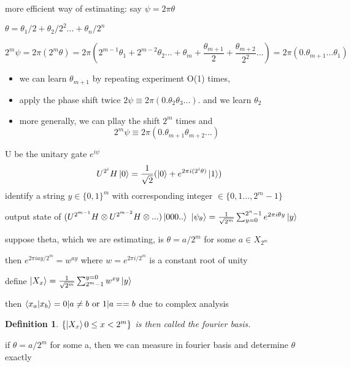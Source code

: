 \documentclass[10pt]{article}
\newcommand{\su}[2]{\sum_{#1}^{#2}}
\theoremstyle{break}
\newtheorem{defn}{Definition}[subsection]
\begin{document}
        \subsection{}
        more efficient way of estimating: say $\psi = 2\pi\theta$

        $\theta = \theta_1/2+\theta_2/2^2...+\theta_n/2^n$

        $$2^m\psi = 2\pi (2^m\theta) = 2\pi(2^{m-1}\theta_1+2^{m-2}\theta_2...+\theta_m+\frac{\theta_{m+1}}{2}+\frac{\theta_{m+2}}{2^2}...)
        =
        2\pi(0.\theta_{m+1}...\theta_1)$$
        
        \begin{itemize}
            \item we can learn $\theta_{m+1}$ by repeating experiment O(1) times, 
            \item apply the phase shift twice $2\psi \equiv 2\pi(0.\theta_2\theta_3...)$. and we learn $\theta_2$
            \item more generally, we can pllay the shift $2^m$ times and 
            $$2^m\psi\equiv 2\pi(0.\theta_{m+1}\theta_{m+2}...)$$
        \end{itemize}
        U be the unitary gate $e^{i\psi}$
        $$U^{2^i} H \ket{0} = \frac{1}{\sqrt{2}}(\ket{0}+e^{2\pi i(2^i\theta)}\ket{1})$$
        identify a string $y\in\{0,1\}^m$ with corresponding integer $\in\{0,1...,2^m-1\}$

        output state of $(U^{2^{m-1}}H\otimes U^{2^{m-2}}H\otimes  ...) \ket{000..}$
        $\ket{\psi_\theta} = \frac{1}{\sqrt{2^m}}\su{y=0}{2^n-1}e^{2\pi i \theta y}\ket{y}$
        

        suppose theta, which we are estimating, is $\theta = a/2^m$ for some $a\in X_{2^m}$

        then $e^{2\pi i a y/2^m} = w^{ay}$ where $w=e^{2\pi i/2^m}$ is a constant root of unity 

        define $\ket{X_x}=\frac{1}{\sqrt{2^m}}\su{2^m-1}{y=0}w^{xy}\ket{y}$

        then $\braket{x_a}{x_b}=0|a\neq b \text{ or } 1|a==b$ due to complex analysis

        \begin{defn}
            $\{\ket{X_x} 0\leq x < 2^m\}$ is then called the fourier basis.
        \end{defn}

        if $\theta = a/2^m$ for some a, then we can measure in fourier basis and determine $\theta$ exactly 
\end{document}
